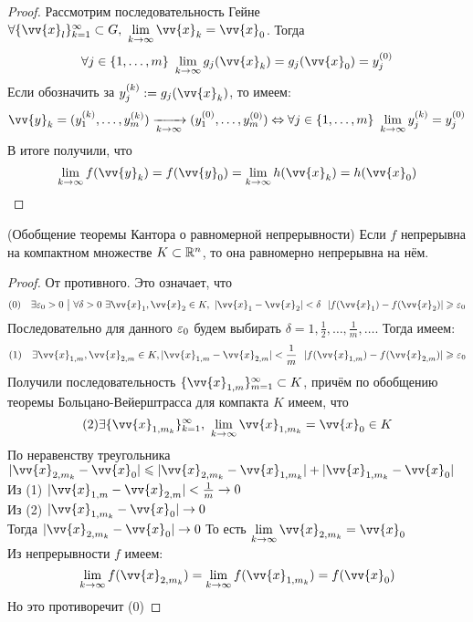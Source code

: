 \begin{proof}
	Рассмотрим последовательность Гейне $\forall \{\vv{x}_l\}_{k = 1}^\infty \subset G,\ \liml_{k \to \infty} \vv{x}_k = \vv{x}_0$. Тогда
	\[
		\forall j \in \range{m}\ \liml_{k \to \infty} g_j(\vv{x}_k) = g_j(\vv{x}_0) = y_j^{(0)}
	\]
	Если обозначить за $y_j^{(k)} := g_j(\vv{x}_k)$, то имеем:
	\[
		\vv{y}_k = (y_1^{(k)}, \ldots, y_m^{(k)}) \xrightarrow[k \to \infty]{} (y_1^{(0)}, \ldots, y_m^{(0)}) \lra \forall j \in \range{m}\ \liml_{k \to \infty} y_j^{(k)} = y_j^{(0)}
	\]
	В итоге получили, что
	\[
		\liml_{k \to \infty} f(\vv{y}_k) = f(\vv{y}_0) = \liml_{k \to \infty} h(\vv{x}_k) = h(\vv{x}_0)
	\]
\end{proof}

\begin{theorem} (Обобщение теоремы Кантора о равномерной непрерывности)
	Если $f$ непрерывна на компактном множестве $K \subset \mathbb{R}^n$, то она равномерно непрерывна на нём.
\end{theorem}

\begin{proof}
	От противного. Это означает, что
	\[(0)\quad
		\exists \eps_0 > 0 \such \forall \delta > 0\ \exists \vv{x}_1, \vv{x}_2 \in K,\ |\vv{x}_1 - \vv{x}_2| < \delta\ \ |f(\vv{x}_1) - f(\vv{x}_2)| \ge \eps_0
	\]
	Последовательно для данного $\varepsilon_0$ будем выбирать $\delta = 1, \frac{1}{2}, \ldots, \frac{1}{m}, \ldots$. Тогда имеем:
	\[(1)\quad
		\exists \vv{x}_{1, m}, \vv{x}_{2, m} \in K, |\vv{x}_{1, m} - \vv{x}_{2, m}| < \frac{1}{m}\ \ |f(\vv{x}_{1, m}) - f(\vv{x}_{2, m})| \ge \eps_0
	\]
	Получили последовательность $\{\vv{x}_{1, m}\}_{m = 1}^\infty \subset K$, причём по обобщению теоремы Больцано-Вейерштрасса для компакта $K$ имеем, что
	\[(2)
		\exists \{\vv{x}_{1, m_k}\}_{k = 1}^\infty,\ \liml_{k \to \infty} \vv{x}_{1, m_k} = \vv{x}_0 \in K
	\]
	По неравенству треугольника
	 $|\vv{x}_{2, m_k} - \vv{x}_0| \leq |\vv{x}_{2, m_k} - \vv{x}_{1, m_k}| + |\vv{x}_{1, m_k} - \vv{x}_0|$ \\
	Из (1) $|\vv{x}_{1, m} - \vv{x}_{2, m}| < \frac{1}{m} \to 0$ \\
	Из (2) $|\vv{x}_{1, m_k} - \vv{x}_0| \to 0$ \\
	Тогда  $|\vv{x}_{2, m_k} - \vv{x}_0| \to 0$  То есть $\liml_{k \to \infty} \vv{x}_{2, m_k} = \vv{x}_0$ \\
	Из непрерывности $f$ имеем:
	\[
		\liml_{k \to \infty} f(\vv{x}_{2, m_k}) = \liml_{k \to \infty} f(\vv{x}_{1, m_k}) = f(\vv{x}_0)
	\]
	Но это противоречит (0)
\end{proof}

